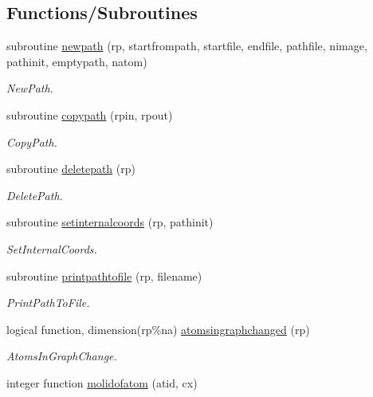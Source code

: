 \subsection*{Functions/\+Subroutines}
\begin{DoxyCompactItemize}
\item 
subroutine \mbox{\hyperlink{namespacerpath_ab6d6281ea4bcaee28c63f8d7d38e746a}{newpath}} (rp, startfrompath, startfile, endfile, pathfile, nimage, pathinit, emptypath, natom)
\begin{DoxyCompactList}\small\item\em New\+Path. \end{DoxyCompactList}\item 
subroutine \mbox{\hyperlink{namespacerpath_ad6c77a07ce6a59e54a4774305efe44d4}{copypath}} (rpin, rpout)
\begin{DoxyCompactList}\small\item\em Copy\+Path. \end{DoxyCompactList}\item 
subroutine \mbox{\hyperlink{namespacerpath_acc28b3649c7753a676d4d6c4e6635286}{deletepath}} (rp)
\begin{DoxyCompactList}\small\item\em Delete\+Path. \end{DoxyCompactList}\item 
subroutine \mbox{\hyperlink{namespacerpath_a14303787a571dd0cb770f37003d45bc6}{setinternalcoords}} (rp, pathinit)
\begin{DoxyCompactList}\small\item\em Set\+Internal\+Coords. \end{DoxyCompactList}\item 
subroutine \mbox{\hyperlink{namespacerpath_a04757ca5d0ed595868763b0883801c03}{printpathtofile}} (rp, filename)
\begin{DoxyCompactList}\small\item\em Print\+Path\+To\+File. \end{DoxyCompactList}\item 
logical function, dimension(rp\%na) \mbox{\hyperlink{namespacerpath_a78a0f8974549227aa339b790407b8c60}{atomsingraphchanged}} (rp)
\begin{DoxyCompactList}\small\item\em Atoms\+In\+Graph\+Change. \end{DoxyCompactList}\item 
integer function \mbox{\hyperlink{namespacerpath_a737b05b4102dd39fe9fb25544f8cef5b}{molidofatom}} (atid, cx)

\end{DoxyCompactItemize}

